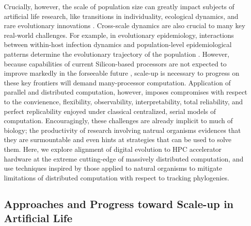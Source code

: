 Crucially, however, the scale of population size can greatly impact subjects of artificial life research, like transitions in individuality, ecological dynamics, and rare evolutionary innovations \citep{taylor2016open,dolson2021digital,taylor2019evolutionary}.
Cross-scale dynamics are also crucial to many key real-world challenges.
For example, in evolutionary epidemiology, interactions between within-host infection dynamics and population-level epidemiological patterns determine the evolutionary trajectory of the population \citep{schreiber2021cross}.
However, because capabilities of current Silicon-based processors are not expected to improve markedly in the forseeable future \citep{sutter2005free}, scale-up is necessary to progress on these key frontiers will demand many-processor computation.
Application of parallel and distributed computation, however, imposes compromises with respect to the convienence, flexibility, observability, interpretability, total reliability, and perfect replicability enjoyed under classical centralized, serial models of computation.
Encouragingly, these challenges are already implicit to much of biology; the productivity of research involving natrual organisms evidences that they are surmountable and even hints at strategies that can be used to solve them.
Here, we explore alignment of digital evolution to HPC accelerator hardware at the extreme cutting-edge of massively distributed computation, and use techniques inspired by those applied to natural organisms to mitigate limitations of distributed computation with respect to tracking phylogenies.

\subsection{Approaches and Progress toward Scale-up in Artificial Life}


